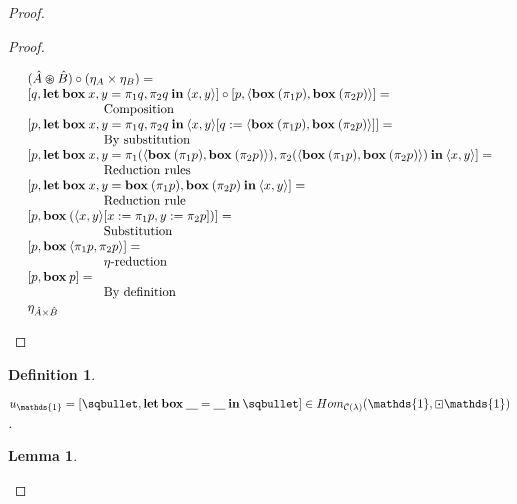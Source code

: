 \documentclass[a4paper]{article}
\newtheorem{lemma}{Lemma}
\newtheorem{defin}{Definition}
\begin{document}
\begin{proof}
\begin{proof}
\begin{enumerate}
$\begin{array}{lll}
& (\hat{A} \varoast \hat{B}) \circ (\eta_{A} \times \eta_{B}) = & \\
& [q, {\bf let \: box \:} x, y = \pi_1 q, \pi_2 q {\: \bf in \:} \langle x, y \rangle] \circ [p, \langle {\bf box \:} (\pi_1 p), {\bf box \:} (\pi_2 p) \rangle] = & \\
& \quad\quad\quad\quad\quad\quad \text{Composition}& \\
& [p, {\bf let \: box \:} x, y = \pi_1 q, \pi_2 q {\: \bf in \:} \langle x, y \rangle [q := \langle {\bf box \:} (\pi_1 p), {\bf box \:} (\pi_2 p) \rangle]] = & \\
& \quad\quad\quad\quad\quad\quad \text{By substitution}& \\
& [p, {\bf let \: box \:} x, y = \pi_1 (\langle {\bf box \:} (\pi_1 p), {\bf box \:} (\pi_2 p) \rangle), \pi_2 (\langle {\bf box \:} (\pi_1 p), {\bf box \:} (\pi_2 p) \rangle) {\: \bf in \:} \langle x, y \rangle] = & \\
& \quad\quad\quad\quad\quad\quad \text{Reduction rules}& \\
& [p, {\bf let \: box \:} x, y = {\bf box \:} (\pi_1 p), {\bf box \:} (\pi_2 p) {\: \bf in \:} \langle x, y \rangle] = & \\
& \quad\quad\quad\quad\quad\quad \text{Reduction rule}& \\
& [p, {\bf box \:} (\langle x,y \rangle [x := \pi_1 p, y := \pi_2 p])] = & \\
& \quad\quad\quad\quad\quad\quad \text{Substitution}& \\
& [p, {\bf box \:} \langle \pi_1 p, \pi_2 p \rangle] = & \\
& \quad\quad\quad\quad\quad\quad \text{$\eta$-reduction}& \\
& [p, {\bf box \:} p] =& \\
& \quad\quad\quad\quad\quad\quad \text{By definition}& \\
& \eta_{\hat{A} \times \hat{B}}&
\end{array}$
\end{enumerate}
\end{proof}

\begin{defin}
  $ $

  $u_{\mathds{1}} = [\sqbullet, {\bf let \: box \:} \underline{\quad} = \underline{\quad} {\: \bf in \:} \sqbullet] \in Hom_{\mathcal{C}(\lambda)}(\mathds{1}, \boxdot \mathds{1})$.
\end{defin}

\begin{lemma}
  $ $


\end{lemma}
\end{proof}
\end{document}
